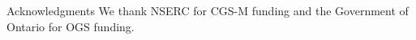 \documentclass[22pt]{beamer}
\begin{document}
\begin{frame}[fragile]
\begin{textblock}{7.25}
        \begin{block}{\fontsize{37}{20}\selectfont Acknowledgments}
            We thank NSERC for CGS-M funding and the Government of Ontario for OGS funding.
        \end{block}
    \end{textblock}

\end{frame}
\end{document}
